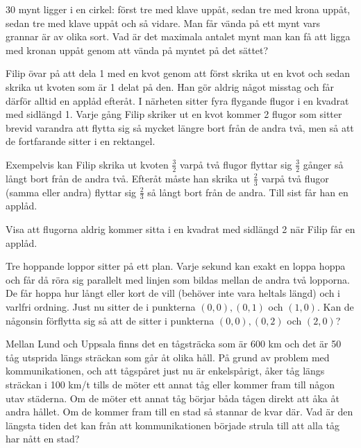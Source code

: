 \setcounter{theorem}{0}
\setcounter{section}{\thesection+1} %
\begin{problem}
30 mynt ligger i en cirkel: först tre med klave uppåt, sedan tre med krona uppåt, sedan tre med klave uppåt och så vidare. Man får vända på ett mynt vars grannar är av olika sort. Vad är det maximala antalet mynt man kan få att ligga med kronan uppåt genom att vända på myntet på det sättet?
\end{problem}

\setcounter{theorem}{0}
\setcounter{section}{\thesection+1} %
\begin{problem}
	Filip övar på att dela 1 med en kvot genom att först skrika ut en kvot och sedan skrika ut kvoten som är 1 delat på den. Han gör aldrig något misstag och får därför alltid en applåd efteråt. I närheten sitter fyra flygande flugor i en kvadrat med sidlängd 1. Varje gång Filip skriker ut en kvot kommer 2 flugor som sitter brevid varandra att flytta sig så mycket längre bort från de andra två, men så att de fortfarande sitter i en rektangel. 

	Exempelvis kan Filip skrika ut kvoten \(\frac{3}{2}\) varpå två flugor flyttar sig \(\frac{3}{2}\) gånger så långt bort från de andra två. Efteråt måste han skrika ut \(\frac{2}{3}\) varpå två flugor (samma eller andra) flyttar sig \(\frac{2}{3}\) så långt bort från de andra. Till sist får han en applåd. 

	Visa att flugorna aldrig kommer sitta i en kvadrat med sidlängd 2 när Filip får en applåd.
\end{problem}


\begin{problem}
	Tre hoppande loppor sitter på ett plan. Varje sekund kan exakt en loppa hoppa och får då röra sig parallelt med linjen som bildas mellan de andra två lopporna. De får hoppa hur långt eller kort de vill (behöver inte vara heltals längd) och i varlfri ordning. Just nu sitter de i punkterna \((0, 0), (0,1)\) och \((1, 0)\). Kan de någonsin förflytta sig så att de sitter i punkterna \((0, 0), (0,2)\) och \((2, 0)\)?
\end{problem}

\setcounter{theorem}{0}
\setcounter{section}{\thesection+1}
\begin{problem}
	Mellan Lund och Uppsala finns det en tågsträcka som är 600 km och det är 50 tåg utsprida längs sträckan som går åt olika håll. På grund av problem med kommunikationen, och att tågspåret just nu är enkelspårigt, åker tåg längs sträckan i 100 km/t tills de möter ett annat tåg eller kommer fram till någon utav städerna. Om de möter ett annat tåg börjar båda tågen direkt att åka åt andra hållet. Om de kommer fram till en stad så stannar de kvar där. Vad är den längsta tiden det kan från att kommunikationen började strula till att alla tåg har nått en stad?
\end{problem}

